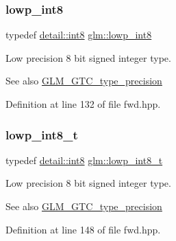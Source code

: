\subsubsection{\texorpdfstring{lowp\+\_\+int8}{lowp\_int8}}
{\footnotesize\ttfamily typedef \hyperlink{namespaceglm_1_1detail_a04b526a8d7a9b455602a0afa78c531e0}{detail\+::int8} \hyperlink{group__gtc__type__precision_gaf9e675b6392764242ae87eb179e9d3d6}{glm\+::lowp\+\_\+int8}}

Low precision 8 bit signed integer type. \begin{DoxySeeAlso}{See also}
\hyperlink{group__gtc__type__precision}{G\+L\+M\+\_\+\+G\+T\+C\+\_\+type\+\_\+precision} 
\end{DoxySeeAlso}


Definition at line 132 of file fwd.\+hpp.

\mbox{\label{group__gtc__type__precision_gae6092311f6970a305c2df19a372360a3}} 
\subsubsection{\texorpdfstring{lowp\+\_\+int8\+\_\+t}{lowp\_int8\_t}}
{\footnotesize\ttfamily typedef \hyperlink{namespaceglm_1_1detail_a04b526a8d7a9b455602a0afa78c531e0}{detail\+::int8} \hyperlink{group__gtc__type__precision_gae6092311f6970a305c2df19a372360a3}{glm\+::lowp\+\_\+int8\+\_\+t}}

Low precision 8 bit signed integer type. \begin{DoxySeeAlso}{See also}
\hyperlink{group__gtc__type__precision}{G\+L\+M\+\_\+\+G\+T\+C\+\_\+type\+\_\+precision} 
\end{DoxySeeAlso}


Definition at line 148 of file fwd.\+hpp.

\mbox{\label{group__gtc__type__precision_ga22c5364f27caa0a6eb0627cbc21e46be}} 

